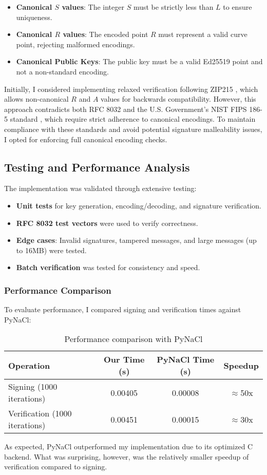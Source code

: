 \documentclass[twoside,a4paper,12pt]{article}
\begin{document}
\begin{itemize}
    \item \textbf{Canonical $S$ values}: The integer $S$ must be strictly less than $L$ to ensure uniqueness.
    \item \textbf{Canonical $R$ values}: The encoded point $R$ must represent a valid curve point, rejecting malformed encodings.
    \item \textbf{Canonical Public Keys}: The public key must be a valid Ed25519 point and not a non-standard encoding.
\end{itemize}

Initially, I considered implementing relaxed verification following ZIP215 \cite{ZIP215}, which allows non-canonical $R$ and $A$ values for backwards compatibility. However, this approach contradicts both RFC 8032 and the U.S. Government's NIST FIPS 186-5 standard \cite{NIST}, which require strict adherence to canonical encodings. To maintain compliance with these standards and avoid potential signature malleability issues, I opted for enforcing full canonical encoding checks.


\subsection{Testing and Performance Analysis}
The implementation was validated through extensive testing:
\begin{itemize}
    \item \textbf{Unit tests} for key generation, encoding/decoding, and signature verification.
    \item \textbf{RFC 8032 test vectors} were used to verify correctness.
    \item \textbf{Edge cases}: Invalid signatures, tampered messages, and large messages (up to 16MB) were tested.
    \item \textbf{Batch verification} was tested for consistency and speed.
\end{itemize}

\subsubsection{Performance Comparison}
To evaluate performance, I compared signing and verification times against {PyNaCl}:

\begin{table}[h]
    \centering
    \begin{tabular}{l|c|c|c}
        \textbf{Operation} & \textbf{Our Time (s)} & \textbf{PyNaCl Time (s)} & \textbf{Speedup} \\
        \hline
        Signing (1000 iterations) & 0.00405 & 0.00008 & $\approx$50x \\
        Verification (1000 iterations) & 0.00451 & 0.00015 & $\approx$30x \\
    \end{tabular}
    \caption{Performance comparison with PyNaCl}
\end{table}
As expected, PyNaCl outperformed my implementation due to its optimized C backend. What was surprising, however, was the relatively smaller speedup of verification compared to signing. 
\end{document}
